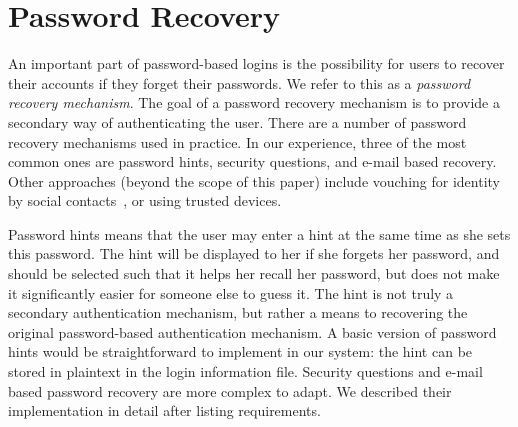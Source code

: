 
\section{Password Recovery}  An important part of
password-based logins is the possibility for users to recover their
accounts if they forget their passwords. We refer to this as a
\emph{password recovery mechanism}. The goal of a password recovery
mechanism is to provide a secondary way of authenticating the
user. There are a number of password recovery mechanisms used in
practice. In our experience, three of the most common ones are
password hints, security questions, and e-mail based recovery. Other
approaches (beyond the scope of this paper) include vouching for identity by
social contacts~\cite{Brainard06}, or using trusted devices.

Password hints means that the user may enter a hint at the same time as she
sets this password. The hint will be displayed to her if she forgets her
password, and should be selected such that it helps her recall her password,
but does not make it significantly easier for someone else to guess it. The
hint is not truly a secondary authentication mechanism, but rather a means to
recovering the original password-based authentication mechanism. A basic 
version of password hints would be straightforward to implement in our system: 
the hint can be stored in plaintext in the login information file. 
Security questions and e-mail based password recovery are more complex to adapt.
We described their implementation in detail after listing requirements.

